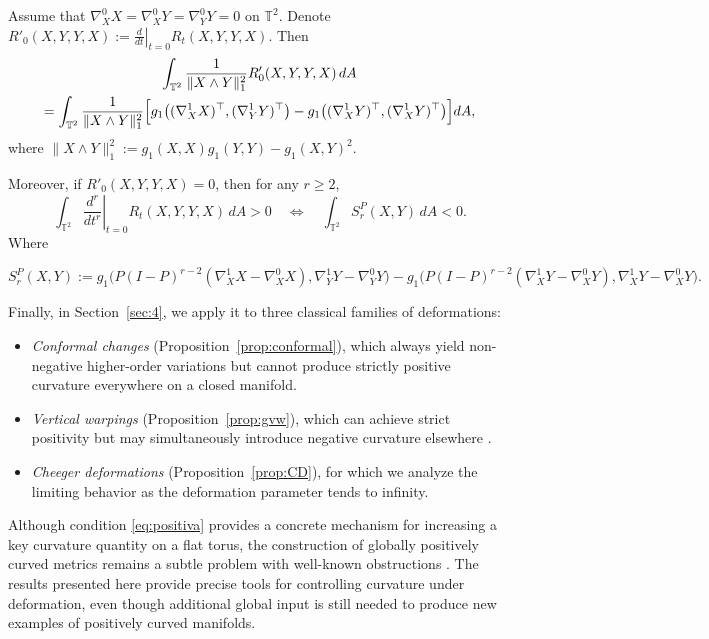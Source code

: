 \documentclass[graybox]{svmult}
\begin{document}
\begin{theorem}\label{thm:rvariation}
Assume that $\nabla^0_X X = \nabla^0_X Y = \nabla^0_Y Y = 0$ on $\mathbb{T}^2$. Denote $R'_0(X,Y,Y,X) := \left.\frac{d}{dt}\right|_{t=0} R_t(X,Y,Y,X)$. Then
\begin{multline}\label{eq:first-variation}
\int_{\mathbb{T}^2} \frac{1}{\|X\wedge Y\|_1^2} R'_0(X,Y,Y,X) \, dA \\
= \int_{\mathbb{T}^2} \frac{1}{\|X\wedge Y\|_1^2} \Bigl[
g_1\bigl((\nabla^1_X X)^\top, (\nabla^1_Y Y)^\top\bigr) 
- g_1\bigl((\nabla^1_X Y)^\top, (\nabla^1_X Y)^\top\bigr) \Bigr] dA,
\end{multline}
where $\|X\wedge Y\|_1^2 := g_1(X,X)g_1(Y,Y) - g_1(X,Y)^2$.

Moreover, if $R'_0(X,Y,Y,X) = 0$, then for any $r \geq 2$,
\begin{equation}\label{eq:higher-order-condition}
\int_{\mathbb{T}^2} \left.\frac{d^r}{dt^r}\right|_{t=0} R_t(X,Y,Y,X) \, dA > 0 
\quad\Longleftrightarrow\quad 
\int_{\mathbb{T}^2} S_r^P(X,Y) \, dA < 0.
\end{equation}
Where

\begin{equation*}\label{eq:S-def}
S_r^P(X,Y) := g_1\!\bigl(P(I-P)^{r-2}(\nabla^1_X X - \nabla^0_X X), \nabla^1_Y Y - \nabla^0_Y Y\bigr)
- g_1\!\bigl(P(I-P)^{r-2}(\nabla^1_X Y - \nabla^0_X Y), \nabla^1_X Y - \nabla^0_X Y\bigr).
\end{equation*}
\end{theorem}



Finally, in Section~\ref{sec:4}, we apply it to three classical families of deformations:
\begin{itemize}
    \item \emph{Conformal changes} (Proposition~\ref{prop:conformal}), which always yield non-negative higher-order variations but cannot produce strictly positive curvature everywhere on a closed manifold.
    \item \emph{Vertical warpings} (Proposition~\ref{prop:gvw}), which can achieve strict positivity but may simultaneously introduce negative curvature elsewhere \cite{speranca_oddbundles}.
    \item \emph{Cheeger deformations} (Proposition~\ref{prop:CD}), for which we analyze the limiting behavior as the deformation parameter tends to infinity.
\end{itemize}

Although condition \eqref{eq:positiva} provides a concrete mechanism for increasing a key curvature quantity on a flat torus, the construction of globally positively curved metrics remains a subtle problem with well-known obstructions \cite{wilking2002manifolds}. The results presented here provide precise tools for controlling curvature under deformation, even though additional global input is still needed to produce new examples of positively curved manifolds.
\end{document}
